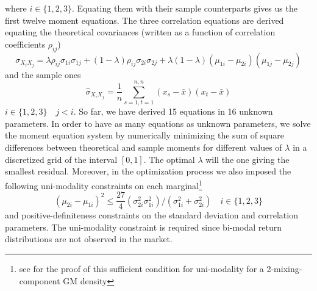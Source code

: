 where $i \in \{1,2,3\}$. Equating them with their sample counterparts gives us the first twelve moment equations. The three correlation equations are derived equating the theoretical covariances (written as a function of correlation coefficients $\rho_{ij}$)
\[ \sigma_{X_iX_j}= \lambda\rho_{ij}\sigma_{1i}\sigma_{1j}+(1-\lambda)\rho_{ij}\sigma_{2i}\sigma_{2j}+\lambda(1-\lambda)(\mu_{1i}-\mu_{2i})(\mu_{1j}-\mu_{2j})   \] and the sample ones \[ \widehat{\sigma}_{X_iX_j} = \frac{1}{n}\sum_{s=1,t=1}^{n,n}(x_s-\bar{x})(x_t-\bar{x})
\]
 $i \in \{1,2,3\} \quad j<i.$ So far, we have derived 15 equations in 16 unknown parameters. In order to have as many equations as unknown parameters, we solve the moment equation system by numerically minimizing the sum of square differences between theoretical and sample moments for different values of $\lambda$ in a discretized grid of the interval $[0,1]$. The optimal $\lambda$ will the one giving the smallest residual. Moreover, in the optimization process we also imposed the following uni-modality constraints on each marginal\footnote{see \cite{Eisenberg64} for the proof of this sufficient condition for uni-modality for a 2-mixing-component GM density}
 \[ (\mu_{2i} - \mu_{1i})^2 \leq \frac{27}{4}(\sigma^2_{2i}\sigma^2_{1i})/(\sigma^2_{1i}+\sigma^2_{2i}) \quad i \in \{1,2,3\}\]
 and positive-definiteness constraints on the standard deviation and correlation parameters. The uni-modality constraint is required  since bi-modal return distributions are not observed in the market.

